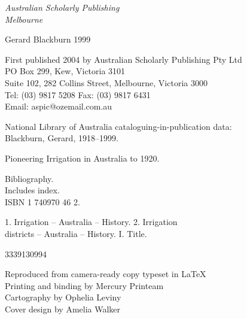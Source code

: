 \documentclass[11pt,b5paper,titlepage]{book}
\newcommand{\clearemptydoublepage}{\newpage{\pagestyle{empty}\cleardoublepage}}
\begin{document}
\begin{titlepage}
\begin{center}
\vspace*{\fill}
{\sffamily\slshape\Large Australian Scholarly Publishing\\Melbourne}
\end{center}
\newpage


\begin{raggedright}

\vspace*{15ex}

 Gerard Blackburn 1999

\bigskip
First published 2004 by Australian Scholarly Publishing Pty Ltd\\
PO Box 299, Kew, Victoria 3101\\
Suite 102, 282 Collins Street, Melbourne, Victoria 3000\\
Tel: (03) 9817 5208 \quad Fax: (03) 9817 6431\\
Email: aspic@ozemail.com.au


\bigskip
National Library of Australia cataloguing-in-publication data:\\

\medskip
Blackburn, Gerard, 1918--1999.
\begin{list}{}{\setlength{\topsep}{0ex}\setlength{\itemsep}{0ex}\setlength{\leftmargin}{2.5ex}}
\item
Pioneering Irrigation in Australia to 1920.
\item
Bibliography.\\
Includes index.\\
ISBN 1 740970 46 2.
\item
1. Irrigation -- Australia -- History. 2. Irrigation\\
districts -- Australia -- History. I. Title.
\end{list}
3339130994

\bigskip
Reproduced from camera-ready copy typeset in \LaTeX\\
Printing and binding by Mercury Printeam\\
Cartography by Ophelia Leviny\\
Cover design by Amelia Walker

\end{raggedright}
\clearemptydoublepage

\end{titlepage}
\end{document}
